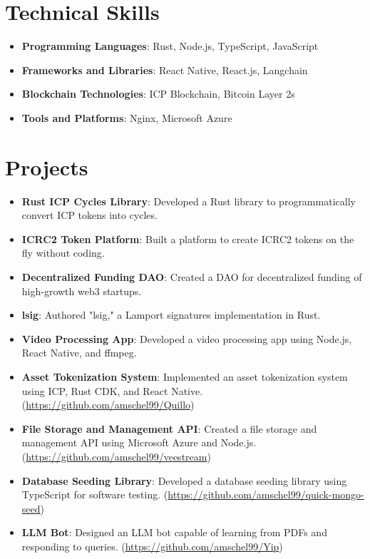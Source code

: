 \documentclass[letterpaper,11pt]{article}
\newcommand{\resumeItem}[2]{
  \item\small{
    \textbf{#1}{: #2 \vspace{-2pt}}
  }
}
\newcommand{\resumeSubHeadingListStart}{\begin{itemize}[leftmargin=*]}
\newcommand{\resumeSubHeadingListEnd}{\end{itemize}}
\begin{document}
\section{Technical Skills}
\resumeSubHeadingListStart
\resumeItem{Programming Languages}
{Rust, Node.js, TypeScript, JavaScript}
\resumeItem{Frameworks and Libraries}
{React Native, React.js, Langchain}
\resumeItem{Blockchain Technologies}
{ICP Blockchain, Bitcoin Layer 2s}
\resumeItem{Tools and Platforms}
{Nginx, Microsoft Azure}
\resumeSubHeadingListEnd

\section{Projects}
\resumeSubHeadingListStart
\resumeItem{Rust ICP Cycles Library}
{Developed a Rust library to programmatically convert ICP tokens into cycles.}
\resumeItem{ICRC2 Token Platform}
{Built a platform to create ICRC2 tokens on the fly without coding.}
\resumeItem{Decentralized Funding DAO}
{Created a DAO for decentralized funding of high-growth web3 startups.}
\resumeItem{lsig}
{Authored "lsig," a Lamport signatures implementation in Rust.}
\resumeItem{Video Processing App}
{Developed a video processing app using Node.js, React Native, and ffmpeg.}
\resumeItem{Asset Tokenization System}
{Implemented an asset tokenization system using ICP, Rust CDK, and React Native. (\href{https://github.com/amschel99/Quillo}{https://github.com/amschel99/Quillo})}
\resumeItem{File Storage and Management API}
{Created a file storage and management API using Microsoft Azure and Node.js. (\href{https://github.com/amschel99/veestream}{https://github.com/amschel99/veestream})}
\resumeItem{Database Seeding Library}
{Developed a database seeding library using TypeScript for software testing. (\href{https://github.com/amschel99/quick-mongo-seed}{https://github.com/amschel99/quick-mongo-seed})}
\resumeItem{LLM Bot}
{Designed an LLM bot capable of learning from PDFs and responding to queries. (\href{https://github.com/amschel99/Yip}{https://github.com/amschel99/Yip})}
\resumeSubHeadingListEnd

\end{document}
